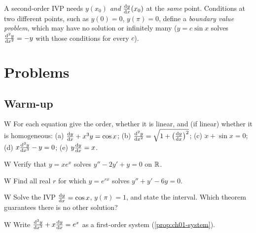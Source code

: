 \begin{pitfall}\label{pit:ch01-ics}
A second-order IVP needs $y(x_0)$ \emph{and} $\frac{\mathrm{d}y}{\mathrm{d}x}(x_0)$ at the
\emph{same} point. Conditions at two different points, such as $y(0) = 0$,
$y(\pi) = 0$, define a \emph{boundary value problem}, which may have no
solution or infinitely many ($y = c\sin x$ solves $\frac{\mathrm{d}^{2}y}{\mathrm{d}x^{2}} = -y$ with
those conditions for every $c$).
\end{pitfall}

\section{Problems}\label{sec:ch01-problems}


\subsection*{Warm-up}

\begin{problem}{W}\label{prob:ch01-w1}
For each equation give the order, whether it is linear, and (if linear)
whether it is homogeneous:
(a) $\frac{\mathrm{d}y}{\mathrm{d}x} + x^3y = \cos x$;
(b) $\frac{\mathrm{d}^{2}y}{\mathrm{d}x^{2}} = \sqrt{1 + \bigl(\frac{\mathrm{d}y}{\mathrm{d}x}\bigr)^2}$;
(c) $\ddot{x} + \sin x = 0$;
(d) $x\frac{\mathrm{d}^{3}y}{\mathrm{d}x^{3}} - y = 0$;
(e) $y\frac{\mathrm{d}y}{\mathrm{d}x} = x$.
\end{problem}

\begin{problem}{W}\label{prob:ch01-w2}
Verify that $y = xe^x$ solves $y'' - 2y' + y = 0$ on $\mathbb{R}$.
\end{problem}

\begin{problem}{W}\label{prob:ch01-w3}
Find all real $r$ for which $y = e^{rx}$ solves $y'' + y' - 6y = 0$.
\end{problem}

\begin{problem}{W}\label{prob:ch01-w4}
Solve the IVP $\frac{\mathrm{d}y}{\mathrm{d}x} = \cos x$, $y(\pi) = 1$, and state the interval.
Which theorem guarantees there is no other solution?
\end{problem}

\begin{problem}{W}\label{prob:ch01-w5}
Write $\frac{\mathrm{d}^{3}y}{\mathrm{d}x^{3}} + x\frac{\mathrm{d}y}{\mathrm{d}x} = e^x$ as a first-order system
(\cref{prop:ch01-system}).
\end{problem}

